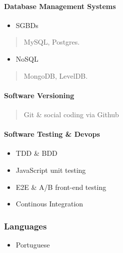\documentclass[]{article}
\providecommand{\tightlist}{%
  \setlength{\itemsep}{0pt}\setlength{\parskip}{0pt}}
\let\oldparagraph\paragraph
\renewcommand{\paragraph}[1]{\oldparagraph{#1}\mbox{}}
\begin{document}
\paragraph{Database Management
Systems}\label{database-management-systems}

\begin{itemize}
\tightlist
\item
  SGBDs
\end{itemize}

\begin{quote}
MySQL, Postgres.
\end{quote}

\begin{itemize}
\tightlist
\item
  NoSQL
\end{itemize}

\begin{quote}
MongoDB, LevelDB.
\end{quote}

\paragraph{Software Versioning}\label{software-versioning}

\begin{quote}
Git \& social coding via Github
\end{quote}

\paragraph{Software Testing \& Devops}\label{software-testing-devops}

\begin{itemize}
\item
  TDD \& BDD
\item
  JavaScript unit testing
\item
  E2E \& A/B front-end testing
\item
  Continous Integration
\end{itemize}

\subsubsection{Languages}\label{languages}

\begin{itemize}
\tightlist
\item
  Portuguese
\end{itemize}
\end{document}

